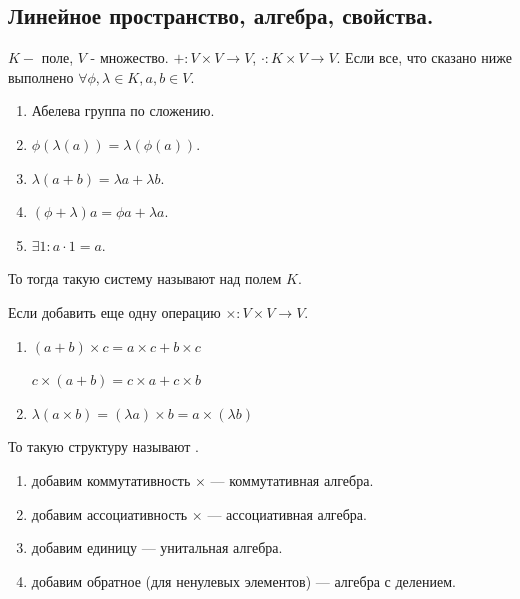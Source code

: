 \subsection{Линейное пространство, алгебра, свойства.}

$K - $ поле, $V$ - множество. $+: V \times V \rightarrow V$, $\cdot: K\times V \rightarrow V$. Если все, что сказано ниже выполнено  $\forall \phi, \lambda \in K, a,b \in V$.

\begin{enumerate}
    \item[1--4.] Абелева группа по сложению.
    \setcounter{enumi}{4}
    \item $ \phi(\lambda(a)) = \lambda(\phi(a))$.
    \item $\lambda (a+b) = \lambda a + \lambda b$.
    \item $( \phi + \lambda) a= \phi a + \lambda a$.
    \item $\exists 1: a \cdot 1 =a$.
\end{enumerate}

То тогда такую систему называют  над полем $K$.

Если добавить еще одну операцию $\times: V \times V \rightarrow V$.

\begin{enumerate}[resume]
    \item $(a+b)\times c = a \times c + b \times c $

          $c\times (a+b) = c \times a + c \times b$

    \item $\lambda (a \times b) = (\lambda a )\times b = a \times (\lambda b)$
\end{enumerate}

То такую структуру называют .

\begin{enumerate}[resume]
    \item добавим коммутативность $\times$ --- коммутативная алгебра.

    \item добавим ассоциативность $\times$ --- ассоциативная алгебра.

    \item добавим единицу --- унитальная алгебра.

    \item добавим обратное (для ненулевых элементов) --- алгебра с делением.
\end{enumerate}

